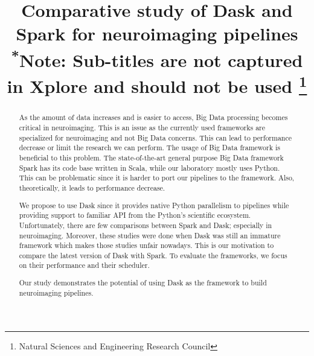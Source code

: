 \documentclass[conference]{IEEEtran}
\begin{document}
\title{Comparative study of Dask and Spark for neuroimaging pipelines\\
{\footnotesize \textsuperscript{*}Note: Sub-titles are not captured in Xplore and
should not be used}
\thanks{Natural Sciences and Engineering Research Council}
}

\author{
\and
{}
\and
{}
}

\maketitle

\begin{abstract}
As the amount of data increases and is easier to access, Big Data processing becomes
critical in neuroimaging.
This is an issue as the currently used frameworks are specialized for neuroimaging
and not Big Data concerns. This can lead to performance decrease or limit the
research we can perform.
The usage of Big Data framework is beneficial to this problem. The state-of-the-art
general purpose Big Data framework Spark has its code base written in Scala, while
our laboratory mostly uses Python. This can be problematic since it is harder to port
our pipelines to the framework. Also, theoretically, it leads to performance decrease.

We propose to use Dask since it provides native Python parallelism to pipelines while
providing support to familiar API from the Python's scientific ecosystem.
Unfortunately, there are few comparisons between Spark and Dask; especially in
neuroimaging. Moreover, these studies were done when Dask was still an immature
framework which makes those studies unfair nowadays. This is our motivation to
compare the latest version of Dask with Spark.
To evaluate the frameworks, we focus on their performance and their scheduler.

Our study demonstrates the potential of using Dask as the framework to build
neuroimaging pipelines.
\end{abstract}
\end{document}
